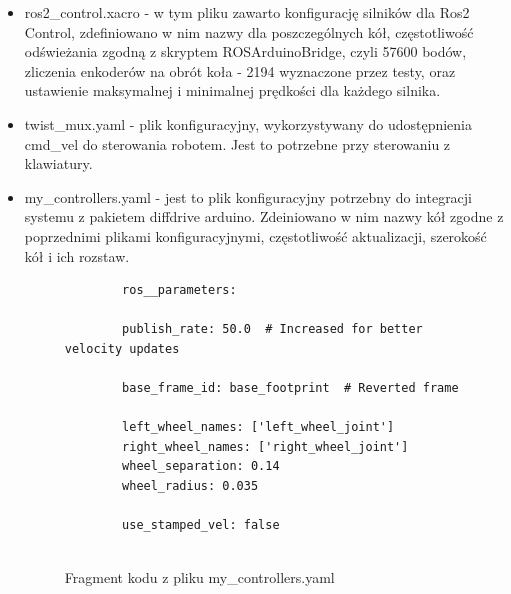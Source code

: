 \documentclass[a4paper,twoside,12pt]{book}
\begin{document}
\begin{itemize}
	\item ros2\_control.xacro - w tym pliku zawarto konfigurację silników dla Ros2 Control, zdefiniowano w nim nazwy dla poszczególnych kół, częstotliwość odświeżania zgodną z skryptem ROSArduinoBridge, czyli 57600 bodów, zliczenia enkoderów na obrót koła - 2194 wyznaczone przez testy, oraz ustawienie maksymalnej i minimalnej prędkości dla każdego silnika.
	\item twist\_mux.yaml - plik konfiguracyjny, wykorzystywany do udostępnienia cmd\_vel do sterowania robotem. Jest to potrzebne przy sterowaniu z klawiatury.
	\newpage \item my\_controllers.yaml - jest to plik konfiguracyjny potrzebny do integracji systemu z pakietem diffdrive arduino. Zdeiniowano w nim nazwy kół zgodne z poprzednimi plikami konfiguracyjnymi, częstotliwość aktualizacji, szerokość kół i ich rozstaw.
	\begin{figure}[!hb]
		\centering
	\begin{lstlisting}
		ros__parameters:

		publish_rate: 50.0  # Increased for better velocity updates
	
		base_frame_id: base_footprint  # Reverted frame
	
		left_wheel_names: ['left_wheel_joint']
		right_wheel_names: ['right_wheel_joint']
		wheel_separation: 0.14  
		wheel_radius: 0.035     
	
		use_stamped_vel: false
	
		\end{lstlisting}
		\caption{Fragment kodu z pliku my\_controllers.yaml}
		\label{fig:my-controllers}
	\end{figure}
\end{itemize}
\newpage
\end{document}
